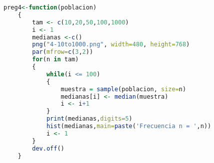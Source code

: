 
\begin{lstlisting}[caption=Resolución en R, language=r]
	preg4<-function(poblacion)
	{
		tam <- c(10,20,50,100,1000)
		i <- 1
		medianas <-c()
		png("4-10to1000.png", width=480, height=768)
		par(mfrow=c(3,2))
		for(n in tam)
		{
			while(i <= 100)
			{
				muestra = sample(poblacion, size=n)
				medianas[i] <- median(muestra)
				i <- i+1
			}
			print(medianas,digits=5)
			hist(medianas,main=paste('Frecuencia n = ',n))
			i <- 1
		}
		dev.off()
	}
\end{lstlisting}